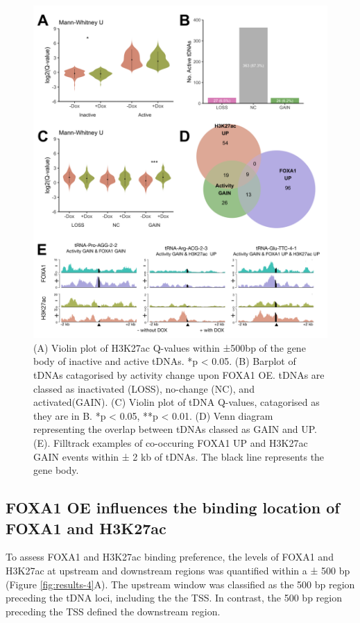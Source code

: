 \documentclass[
  12pt,
]{article}
\begin{document}
\begin{figure}[p]
\includegraphics[width=1\linewidth]{../images/results-03} \caption{(A) Violin plot of H3K27ac Q-values within ±500bp of the gene body of inactive and active tDNAs. *p < 0.05. (B) Barplot of tDNAs catagorised by activity change upon FOXA1 OE. tDNAs are classed as inactivated (LOSS), no-change (NC), and activated(GAIN). (C) Violin plot of tDNA Q-values, catagorised as they are in B. *p < 0.05, **p < 0.01. (D) Venn diagram representing the overlap between tDNAs classed as GAIN and UP. (E). Filltrack examples of co-occuring FOXA1 UP and H3K27ac GAIN events within ± 2 kb of tDNAs. The black line represents the gene body.}\label{fig:results-3}
\end{figure}

\hypertarget{foxa1-oe-influences-the-binding-location-of-foxa1-and-h3k27ac}{%
\subsection{FOXA1 OE influences the binding location of FOXA1 and H3K27ac}\label{foxa1-oe-influences-the-binding-location-of-foxa1-and-h3k27ac}}

To assess FOXA1 and H3K27ac binding preference, the levels of FOXA1 and H3K27ac at upstream and downstream regions was quantified within a ± 500 bp (Figure \ref{fig:results-4}A).
The upstream window was classified as the 500 bp region preceding the tDNA loci, including the the TSS.
In contrast, the 500 bp region preceding the TSS defined the downstream region.
\end{document}
